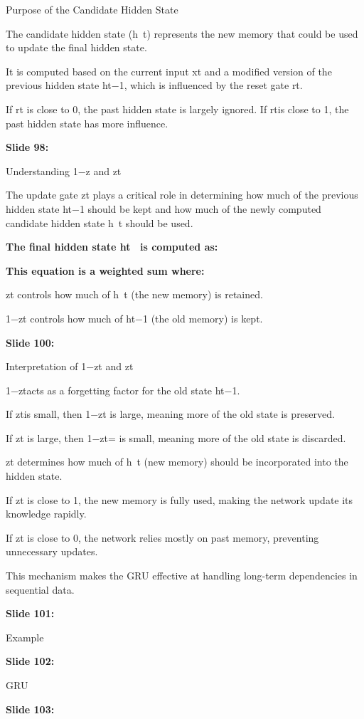\documentclass[11pt,a4paper]{article}
\begin{document}
Purpose of the Candidate Hidden State

The candidate hidden state (h~t​) represents the new memory that could be used to update the final hidden state.

It is computed based on the current input xt and a modified version of the previous hidden state ht−1​, which is influenced by the reset gate rt​.

If rt​ is close to 0, the past hidden state is largely ignored. If rt​ is close to 1, the past hidden state has more influence.

\textbf{Slide 98:}

Understanding 1−z  and zt

The update gate zt​ plays a critical role in determining how much of the previous hidden state ht−1​ should be kept and how much of the newly computed candidate hidden state h~t​ should be used.

\textbf{The final hidden state ht  is computed as:} 

\textbf{This equation is a weighted sum where:} 

zt​ controls how much of h~t (the new memory) is retained.

1−zt controls how much of ht−1​ (the old memory) is kept.

\textbf{Slide 100:}

Interpretation of 1−zt​ and zt

1−ztacts as a forgetting factor for the old state ht−1​.

If ztis small, then 1−zt is large, meaning more of the old state is preserved.

If zt​ is large, then 1−zt=​ is small, meaning more of the old state is discarded.

zt​ determines how much of h~t​ (new memory) should be incorporated into the hidden state.

If zt​ is close to 1, the new memory is fully used, making the network update its knowledge rapidly.

If zt​ is close to 0, the network relies mostly on past memory, preventing unnecessary updates.

This mechanism makes the GRU effective at handling long-term dependencies in sequential data.

\textbf{Slide 101:}

Example

\textbf{Slide 102:}

GRU

\textbf{Slide 103:}
\end{document}
